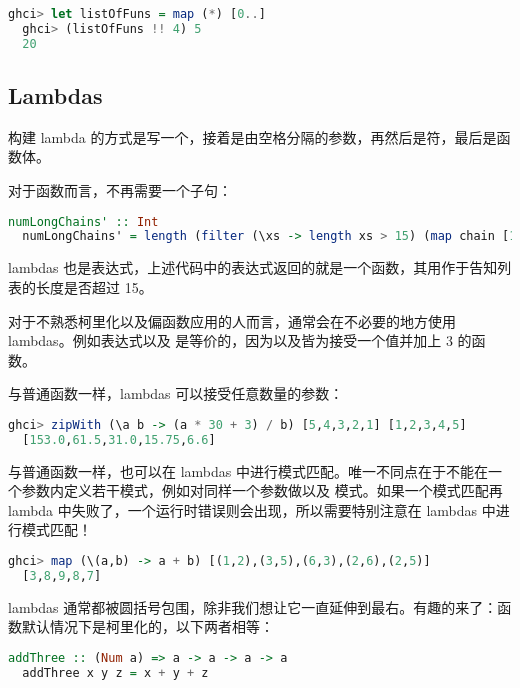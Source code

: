 \documentclass[./main.tex]{subfiles}
\begin{document}
\begin{lstlisting}[language=Haskell]
  ghci> let listOfFuns = map (*) [0..]
  ghci> (listOfFuns !! 4) 5
  20
\end{lstlisting}

\subsection*{Lambdas}

构建 lambda 的方式是写一个\acode{\\}，接着是由空格分隔的参数，再然后是\acode{->}符，最后是函数体。

对于函数而言，不再需要一个子句：

\begin{lstlisting}[language=Haskell]
  numLongChains' :: Int
  numLongChains' = length (filter (\xs -> length xs > 15) (map chain [1 .. 100]))
\end{lstlisting}

lambdas 也是表达式，上述代码中的表达式返回的就是一个函数，其用作于告知列表的长度是否超过 15。

对于不熟悉柯里化以及偏函数应用的人而言，通常会在不必要的地方使用 lambdas。例如表达式以及
是等价的，因为以及皆为接受一个值并加上 3 的函数。

与普通函数一样，lambdas 可以接受任意数量的参数：

\begin{lstlisting}[language=Haskell]
  ghci> zipWith (\a b -> (a * 30 + 3) / b) [5,4,3,2,1] [1,2,3,4,5]
  [153.0,61.5,31.0,15.75,6.6]
\end{lstlisting}

与普通函数一样，也可以在 lambdas 中进行模式匹配。唯一不同点在于不能在一个参数内定义若干模式，例如对同样一个参数做\acode{[]}以及
模式。如果一个模式匹配再 lambda 中失败了，一个运行时错误则会出现，所以需要特别注意在 lambdas 中进行模式匹配！

\begin{lstlisting}[language=Haskell]
  ghci> map (\(a,b) -> a + b) [(1,2),(3,5),(6,3),(2,6),(2,5)]
  [3,8,9,8,7]
\end{lstlisting}

lambdas 通常都被圆括号包围，除非我们想让它一直延伸到最右。有趣的来了：函数默认情况下是柯里化的，以下两者相等：

\begin{lstlisting}[language=Haskell]
  addThree :: (Num a) => a -> a -> a -> a
  addThree x y z = x + y + z
\end{lstlisting}
\end{document}
